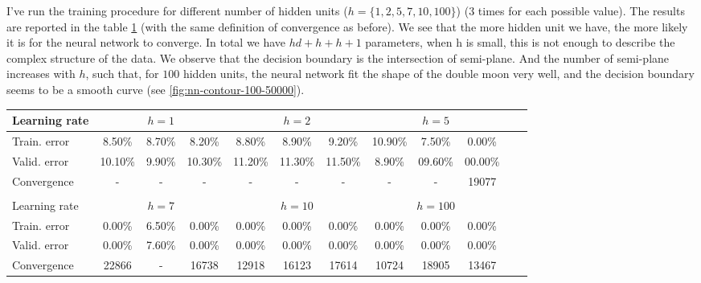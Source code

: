 \documentclass{article}
\newcommand{\gc}[1]{{\color{goodcolor} #1}}
\newcommand{\bc}[1]{{\color{badcolor} #1}}
\begin{document}
I've run the training procedure for different number of hidden units
($h = \{1, 2, 5, 7, 10, 100\}$) (3 times for each possible value). The
results are reported in the table \ref{tab:hidden-neurons} (with the
same definition of convergence as before). We see that the more hidden
unit we have, the more likely it is for the neural network to
converge.  In total we have $h d + h + h + 1$ parameters, when h is
small, this is not enough to describe the complex structure of the
data. We observe that the decision boundary is the intersection of
semi-plane. And the number of semi-plane increases with $h$, such
that, for $100$ hidden units, the neural network fit the shape of the
double moon very well, and the decision boundary seems to be a smooth
curve (see \ref{fig:nn-contour-100-50000}).

\begin{table}[h!]
  \centering
  \begin{tabular}{|l|c|c|c|c|c|c|c|c|c|c|c|}
    \hline
    Learning rate & \multicolumn{3}{c|}{$h = 1$} & \multicolumn{3}{c|}{$h = 2$} & \multicolumn{3}{c|}{$h = 5$} \\
    \hline
    Train. error & \bc{8.50\% } & \bc{8.70\% } & \bc{8.20\% } & \bc{8.80\% } & \bc{8.90\% } & \bc{9.20\% } & \bc{10.90\%} & \bc{7.50\% } & \gc{0.00\% } \\
    Valid. error & \bc{10.10\%} & \bc{9.90\% } & \bc{10.30\%} & \bc{11.20\%} & \bc{11.30\%} & \bc{11.50\%} & \bc{8.90\% } & \bc{09.60\%} & \gc{00.00\%} \\
    Convergence  & \bc{   -   } & \bc{   -   } & \bc{   -   } & \bc{   -   } & \bc{   -   } & \bc{   -   } & \bc{  -    } & \bc{   -   } & \gc{19077  } \\
    \hline
    \multicolumn{7}{c}{} \\
    \hline
    Learning rate & \multicolumn{3}{c|}{$h = 7$} & \multicolumn{3}{c|}{$h = 10$} & \multicolumn{3}{c|}{$h = 100$} \\
    \hline
    Train. error & \gc{0.00\%} & \bc{6.50\% }& \gc{0.00\%} & \gc{0.00\%} & \gc{0.00\%} & \gc{0.00\%} & \gc{0.00\%} & \gc{0.00\%} & \gc{0.00\%} \\
    Valid. error & \gc{0.00\%} & \bc{7.60\% }& \gc{0.00\%} & \gc{0.00\%} & \gc{0.00\%} & \gc{0.00\%} & \gc{0.00\%} & \gc{0.00\%} & \gc{0.00\%} \\
    Convergence  & \gc{22866 } & \bc{   -   }& \gc{16738 } & \gc{12918 } & \gc{16123 } & \gc{17614 } & \gc{10724 } & \gc{18905 } & \gc{13467 } \\
    \hline
  \end{tabular}
   \label{tab:hidden-neurons}
\end{table}
\end{document}
